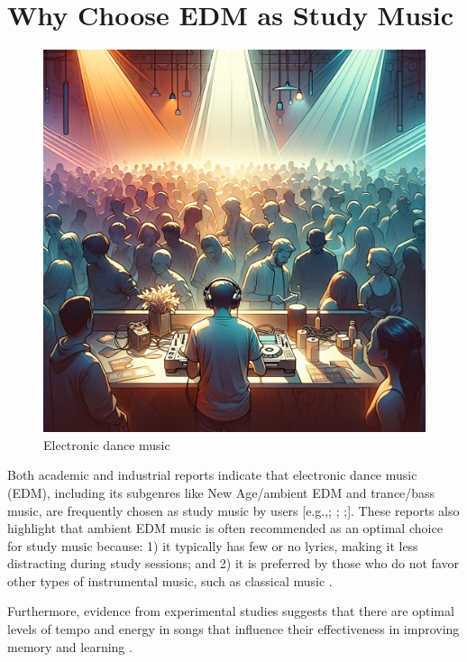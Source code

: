 \documentclass[
]{book}
\begin{document}
\hypertarget{why-choose-edm-as-study-music}{%
\section{Why Choose EDM as Study Music}\label{why-choose-edm-as-study-music}}

\begin{figure}
\centering
\includegraphics{4.png}
\caption{Electronic dance music}
\end{figure}

Both academic and industrial reports indicate that electronic dance music (EDM), including its subgenres like New Age/ambient EDM and trance/bass music, are frequently chosen as study music by users {[}e.g.,\citet{bosk2022electronic}; \citet{dov2020positive}; \citet{NationalUniversity2021};{]}. These reports also highlight that ambient EDM music is often recommended as an optimal choice for study music because: 1) it typically has few or no lyrics, making it less distracting during study sessions; and 2) it is preferred by those who do not favor other types of instrumental music, such as classical music \citep{NationalUniversity2021}.

Furthermore, evidence from experimental studies suggests that there are optimal levels of tempo and energy in songs that influence their effectiveness in improving memory and learning \citep[e.g.,][]{musliu2017impact}.
\end{document}
